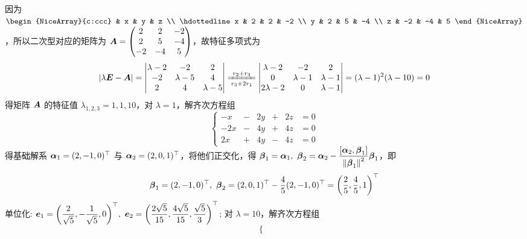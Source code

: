 \begin{solution}
    因为 $\begin{NiceArray}{c:ccc}
              & x  & y  & z  \\ \hdottedline
            x & 2  & 2  & -2 \\
            y & 2  & 5  & -4 \\
            z & -2 & -4 & 5
        \end{NiceArray}$，所以二次型对应的矩阵为 $\vb*{A}=\begin{pmatrix}
            2  & 2  & -2 \\
            2  & 5  & -4 \\
            -2 & -4 & 5
        \end{pmatrix}$，故特征多项式为
    $$|\lambda\vb*{E}-\vb*{A}|=\begin{vmatrix}
            \lambda -2 & -2         & 2         \\
            -2         & \lambda -5 & 4         \\
            2          & 4          & \lambda-5
        \end{vmatrix}\xlongequal[r_3+2r_1]{r_2+r_3}\begin{vmatrix}
            \lambda -2  & -2         & 2          \\
            0           & \lambda -1 & \lambda -1 \\
            2\lambda -2 & 0          & \lambda -1
        \end{vmatrix}=(\lambda-1)^2(\lambda-10)=0$$
    得矩阵 $\vb*{A}$ 的特征值 $\lambda_{1,2,3}=1,1,10$，对 $\lambda=1$，解齐次方程组
    $$\left\{\begin{matrix}
            -x  & - & 2y & + & 2z & =0 \\
            -2x & - & 4y & + & 4z & =0 \\
            2x  & + & 4y & - & 4z & =0
        \end{matrix}\right.$$
    得基础解系 $\vb*{\alpha}_1=(2,-1,0)^\top$ 与 $\vb*{\alpha}_2=(2,0,1)^\top$，将他们正交化，得 $\vb*{\beta}_1=\vb*{\alpha}_1,~\vb*{\beta}_2=\vb*{\alpha}_2-\dfrac{\comm{\vb*{\alpha}_2}{\vb*{\beta}_1}}{\norm{\vb*{\beta}_1}^2}\vb*{\beta}_1$，即
    $$\vb*{\beta}_1=(2,-1,0)^\top,~\vb*{\beta}_2=(2,0,1)^\top-\dfrac{4}{5}(2,-1,0)^\top=\qty(\dfrac{2}{5},\dfrac{4}{5},1)^\top$$
    单位化: $\vb*{e}_1=\qty(\dfrac{2}{\sqrt{5}},-\dfrac{1}{\sqrt{5}},0)^\top,~\vb*{e}_2=\qty(\dfrac{2\sqrt{5}}{15},\dfrac{4\sqrt{5}}{15},\dfrac{\sqrt{5}}{3})^\top$; 对 $\lambda=10$，解齐次方程组
    $$\left\{\begin{matrix}

\end{matrix}$$
\end{solution}
